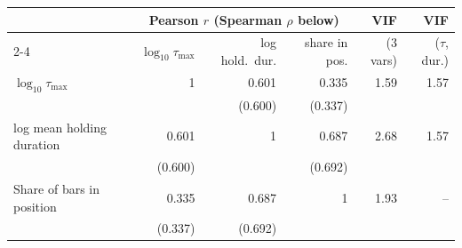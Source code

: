 \begin{tabular}{lrrrrr}
\toprule
 & \multicolumn{3}{c}{Pearson $r$ (Spearman $\rho$ below)} & VIF & VIF \\
\cmidrule(lr){2-4}
 & $\log_{10}\tau_{\max}$ & log hold.\ dur. & share in pos. & (3 vars) & ($\tau$, dur.) \\
\midrule
$\log_{10}\tau_{\max}$ & 1 & 0.601 & 0.335 & 1.59 & 1.57 \\
 &  & (0.600) & (0.337) & & \\
log mean holding duration & 0.601 & 1 & 0.687 & 2.68 & 1.57 \\
 & (0.600) &  & (0.692) & & \\
Share of bars in position & 0.335 & 0.687 & 1 & 1.93 & -- \\
 & (0.337) & (0.692) &  & & \\
\bottomrule
\end{tabular}
